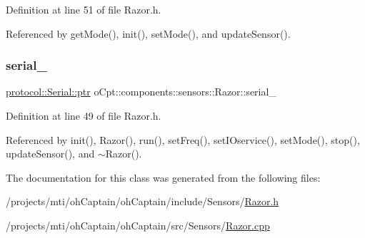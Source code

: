 Definition at line 51 of file Razor.\+h.



Referenced by get\+Mode(), init(), set\+Mode(), and update\+Sensor().

\hypertarget{classo_cpt_1_1components_1_1sensors_1_1_razor_af9d445b2a06bbe42bb965c0e42b711df}{}\label{classo_cpt_1_1components_1_1sensors_1_1_razor_af9d445b2a06bbe42bb965c0e42b711df} 
\subsubsection{\texorpdfstring{serial\+\_\+}{serial\_}}
{\footnotesize\ttfamily \hyperlink{classo_cpt_1_1protocol_1_1_serial_a4c97c6a2456d649974e07a186f634780}{protocol\+::\+Serial\+::ptr} o\+Cpt\+::components\+::sensors\+::\+Razor\+::serial\+\_\+\hspace{0.3cm}{\ttfamily [private]}}



Definition at line 49 of file Razor.\+h.



Referenced by init(), Razor(), run(), set\+Freq(), set\+I\+Oservice(), set\+Mode(), stop(), update\+Sensor(), and $\sim$\+Razor().



The documentation for this class was generated from the following files\+:\begin{DoxyCompactItemize}
\item 
/projects/mti/oh\+Captain/oh\+Captain/include/\+Sensors/\hyperlink{_razor_8h}{Razor.\+h}\item 
/projects/mti/oh\+Captain/oh\+Captain/src/\+Sensors/\hyperlink{_razor_8cpp}{Razor.\+cpp}\end{DoxyCompactItemize}
